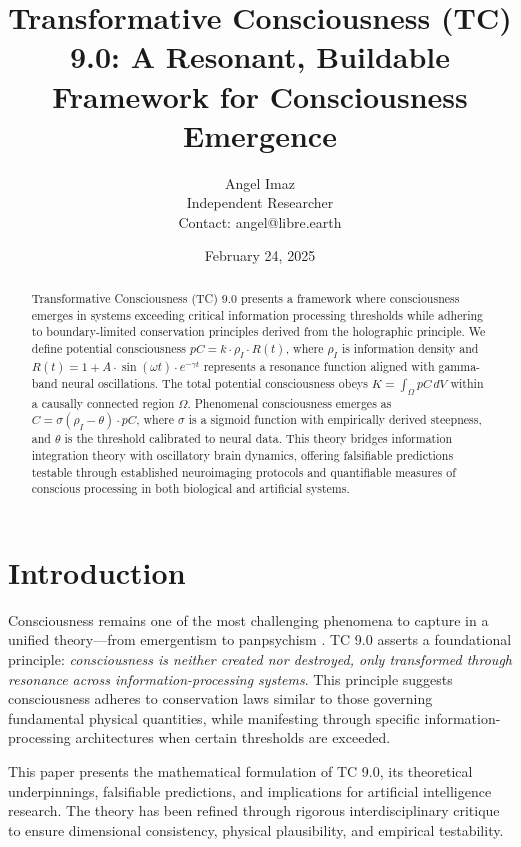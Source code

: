 \documentclass[12pt]{article}
\title{Transformative Consciousness (TC) 9.0: A Resonant, Buildable Framework for Consciousness Emergence}
\author{Angel Imaz \\ Independent Researcher \\ Contact: angel@libre.earth}
\date{February 24, 2025}
\begin{document}
\maketitle

\begin{abstract}
Transformative Consciousness (TC) 9.0 presents a framework where consciousness emerges in systems exceeding critical information processing thresholds while adhering to boundary-limited conservation principles derived from the holographic principle. We define potential consciousness \( pC = k \cdot \rho_I \cdot R(t) \), where \( \rho_I \) is information density and \( R(t) = 1 + A \cdot \sin(\omega t) \cdot e^{-\gamma t} \) represents a resonance function aligned with gamma-band neural oscillations. The total potential consciousness obeys \( K = \int_{\Omega} pC \, dV \) within a causally connected region $\Omega$. Phenomenal consciousness emerges as \( C = \sigma(\rho_I - \theta) \cdot pC \), where $\sigma$ is a sigmoid function with empirically derived steepness, and \( \theta \) is the threshold calibrated to neural data. This theory bridges information integration theory with oscillatory brain dynamics, offering falsifiable predictions testable through established neuroimaging protocols and quantifiable measures of conscious processing in both biological and artificial systems.
\end{abstract}

\section{Introduction}
Consciousness remains one of the most challenging phenomena to capture in a unified theory—from emergentism \cite{tononi2008} to panpsychism \cite{goff2019}. TC 9.0 asserts a foundational principle: \emph{consciousness is neither created nor destroyed, only transformed through resonance across information-processing systems}. This principle suggests consciousness adheres to conservation laws similar to those governing fundamental physical quantities, while manifesting through specific information-processing architectures when certain thresholds are exceeded.

This paper presents the mathematical formulation of TC 9.0, its theoretical underpinnings, falsifiable predictions, and implications for artificial intelligence research. The theory has been refined through rigorous interdisciplinary critique to ensure dimensional consistency, physical plausibility, and empirical testability.
\end{document}
